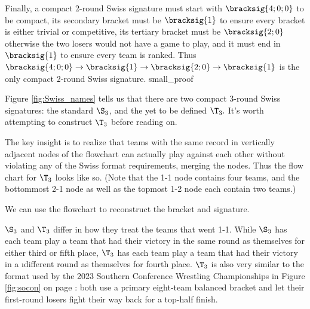 {{        Finally, a compact 2-round Swiss signature must start with $\bracksig{4;0;0}$ to be compact, its secondary bracket must be $\bracksig{1}$ to ensure every bracket is either trivial or competitive, its tertiary bracket must be $\bracksig{2;0}$ otherwise the two losers would not have a game to play, and it must end in $\bracksig{1}$ to ensure every team is ranked. Thus $\bracksig{4;0;0} \to \bracksig{1} \to \bracksig{2;0} \to \bracksig{1}$ is the only compact 2-round Swiss signature.
    }{small_proof}{\fried}

    Figure \ref{fig:Swiss_names} tells us that there are two compact 3-round Swiss signatures: the standard $\S_3$, and the yet to be defined $\T_3.$ It's worth attempting to construct $\T_3$ before reading on.

    The key insight is to realize that teams with the same record in vertically adjacent nodes of the flowchart can actually play against each other without violating any of the Swiss format requirements, merging the nodes. Thus the flow chart for $\T_3$ looks like so. (Note that the 1-1 node contains four teams, and the bottommost 2-1 node as well as the topmost 1-2 node each contain two teams.)


    We can use the flowchart to reconstruct the bracket and signature.


    $\S_3$ and $\T_3$ differ in how they treat the teams that went 1-1. While $\S_3$ has each team play a team that had their victory in the same round as themselves for either third or fifth place, $\T_3$ has each team play a team that had their victory in a \i{different} round as themselves for fourth place.
    $\T_3$ is also very similar to the format used by the 2023 Southern Conference Wrestling Championships in Figure \ref{fig:socon} on page \pageref{fig:socon}: both use a primary eight-team balanced bracket and let their first-round losers fight their way back for a top-half finish.

    }
